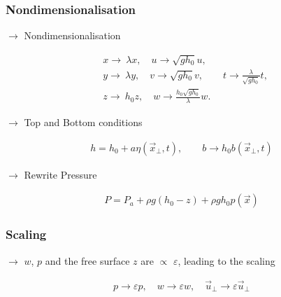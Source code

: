 \documentclass[fleqn]{beamer}
\begin{document}
    \begin{frame}
        \frametitle{Nondimensionalisation}
        $\rightarrow$ Nondimensionalisation
        \begin{ceqn}
        \begin{align}
            &x \rightarrow\ \lambda x, \quad u \rightarrow \sqrt{gh_0} u,
            \nonumber \\
              &y \rightarrow\ \lambda y, \quad v \rightarrow \sqrt{gh_0} v, \qquad
              t\rightarrow \frac{\lambda}{\sqrt{gh_0}}t,\nonumber\\
              &z \rightarrow\ h_0 z, \quad w \rightarrow
            \frac{h_0\sqrt{gh_0}}{\lambda} w.\nonumber
        \end{align}
        \end{ceqn}
        \centering
        $\rightarrow$ Top and Bottom conditions
        \begin{ceqn}
        \begin{align}
        h = h_0 + a \eta(\vec{x}_\perp,t), \qquad  b \rightarrow h_0
        b(\vec{x}_\perp, t)\nonumber
        \end{align}
        \end{ceqn}
        \centering
        $\rightarrow$ Rewrite Pressure
        \begin{ceqn}
        \begin{align}
            P = P_a + \rho g(h_0 -z) + \rho g h_0 p(\vec{x})  \nonumber
        \end{align}
        \end{ceqn}
    \end{frame}

    \begin{frame}
        \frametitle{Scaling}
        \centering
        $\rightarrow$ $w$, $p$ and the free surface $z$ are $\propto$
        $\varepsilon$, leading to the scaling
        \begin{ceqn}
            \begin{align}
                p \rightarrow \varepsilon p, \quad w \rightarrow \varepsilon w, \quad
                \vec{u}_\perp \rightarrow \varepsilon
                \vec{u}_\perp\nonumber
            \end{align}
        \end{ceqn}
        \end{frame}
\end{document}
